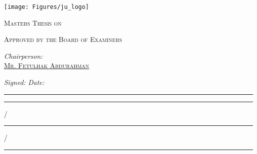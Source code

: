 \documentclass[
12pt, %
oneside, %
english, %
onehalfspacing, %
nolistspacing, %
liststotoc, %
parskip, %
headsepline, %
consistentlayout, %
]{MastersDoctoralThesis} %
\begin{document}

\pagebreak
\thispagestyle{empty} 
\begin{center}

\texttt{[image: Figures/ju\_logo]} 

{\scshape\LARGE \univname\par}\vspace{0.2cm} %
{\scshape\Large \deptname\par}\vspace{0.4cm}
{\scshape\large \facname\par}\vspace{1.4cm}
\textsc{\large Masters Thesis on} %

{\Large \bfseries \ttitle\par}\vspace{1.2cm} %

\textsc{\large Approved by the Board of Examiners}\\[1cm] %

\begin{minipage}[t]{0.5\textwidth}
\begin{flushleft} \large
\emph{Chairperson:}\\[0.1cm] 
\href{https://www.researchgate.net/profile/Fetulhak_Abdurahman}{\textsc{Mr. Fetulhak Abdurahman}} 
\end{flushleft}
\end{minipage}
\begin{minipage}[t]{0.4\textwidth}
\begin{flushright} \large
\emph{Signed: \hspace{4em} Date: } \\[0.1cm]
\rule[0em]{4em}{0.5pt} \hspace{1em} \rule[0em]{1em}{0.5pt} / \rule[0em]{1em}{0.5pt} / \rule[0em]{2em}{0.5pt}
\end{flushright}
\end{minipage}\\[1cm]


\end{center}
\end{document}
